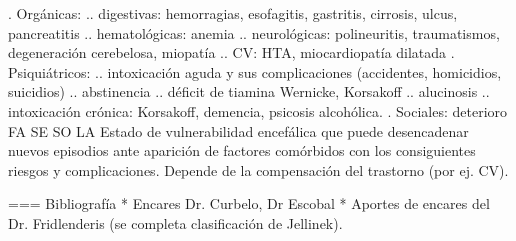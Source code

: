 \documentclass[encares.tex]{subfiles}
\begin{document}
. Orgánicas:
.. digestivas: hemorragias, esofagitis, gastritis, cirrosis, ulcus, pancreatitis
.. hematológicas: anemia
.. neurológicas: polineuritis, traumatismos, degeneración cerebelosa, miopatía
.. CV: HTA, miocardiopatía dilatada
. Psiquiátricos:
.. intoxicación aguda y sus complicaciones (accidentes, homicidios, suicidios)
.. abstinencia
.. déficit de tiamina Wernicke, Korsakoff
.. alucinosis
.. intoxicación crónica: Korsakoff, demencia, psicosis alcohólica.
. Sociales: deterioro FA SE SO LA Estado de vulnerabilidad encefálica que puede desencadenar nuevos episodios ante aparición de factores comórbidos con los consiguientes riesgos y complicaciones. Depende de la compensación del trastorno (por ej. CV).

=== Bibliografía
* Encares Dr. Curbelo, Dr Escobal
* Aportes de encares del Dr. Fridlenderis (se completa clasificación de Jellinek).
\end{document}
